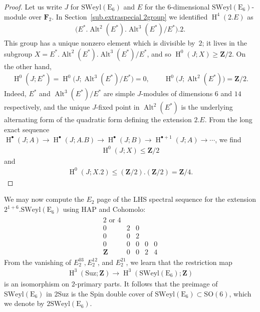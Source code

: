 \documentclass[pdftex]{sigma}
\numberwithin{equation}{section}
\newcommand\bF{\mathbf F}
\newcommand\bZ{\mathbf Z}
\newcommand\rE{\mathrm E}
\DeclareMathOperator\homology{H}
\renewcommand\H{\homology}
\newcommand\<\langle
\renewcommand\>\rangle
\newcommand\Suz{\mathrm{Suz}}
\newcommand\SO{\mathrm{SO}}
\DeclareMathOperator\Alt{Alt}
\newcommand\SWeyl{\mathrm{SWeyl}}
\begin{document}
\begin{proof}Let us write $J$ for $\SWeyl (\rE_6)$ and $E$ for the $6$-dimensional $\SWeyl (\rE_6)$-module over $\bF_2$. In Section~\ref{sub.extraspecial 2group} we identified $\H^4(2.E)$ as
 \begin{gather*} \big(E^*.\Alt^2(E^*).\Alt^3(E^*)/E^*\big).2. \end{gather*}
 This group has a unique nonzero element which is divisible by~$2$; it lives in the subgroup $X = E^*.\Alt^2(E^*).\Alt^3(E^*)/E^*$, and so $\H^0(J; X) \geq \bZ/2$.
 On the other hand,
 \begin{gather*} \H^0(J; E^*) = \H^0\big(J;\Alt^3(E^*)/E^*\big) = 0, \qquad \H^0\big(J;\Alt^2(E^*)\big) = \bZ/2. \end{gather*}
 Indeed, $E^*$ and $\Alt^3(E^*)/E^*$ are simple $J$-modules of dimensions $6$ and $14$ respectively, and the unique
 $J$-fixed point in $\Alt^2(E^*)$ is the underlying alternating form of the quadratic form defining the extension $2.E$. From the long exact sequence $\H^\bullet(J; A) \to \H^\bullet(J; A.B) \to \H^\bullet(J; B) \to \H^{\bullet+1}(J;A) \to \cdots$, we find
 \begin{gather*} \H^0(J;X) \leq \bZ/2\end{gather*}
 and
 \begin{gather*}
 \H^0(J; X.2) \leq (\bZ/2).(\bZ/2) = \bZ/4.\tag*{\qed}
 \end{gather*}\renewcommand{\qed}{}
\end{proof}

We may now compute the $E_2$ page of the LHS spectral sequence for the extension \linebreak $2^{1+6}.\SWeyl (\rE_6)$ using HAP and Cohomolo:
\begin{gather*} \begin{array}{ccccc}
2 \text{ or } 4 \\
0 & 2 & 0 \\
0 & 0 & 2 \\
0 & 0 & 0 & 0 & 0 \\
\bZ & 0 & 0 & 2 & 4
\end{array} \end{gather*}
From the vanishing of $E_2^{03}, E_2^{12}$, and $E_2^{21}$, we learn that the restriction map
\begin{gather*}
\H^3(\Suz;\bZ) \to \H^3(\SWeyl(\rE_6);\bZ)
\end{gather*}
is an isomorphism on $2$-primary parts. It follows that the preimage of $\SWeyl(\rE_6)$ in $2\Suz$ is the Spin double cover of $\SWeyl(\rE_6) \subset \SO(6)$, which we denote by $2\SWeyl(\rE_6)$.
\end{document}
